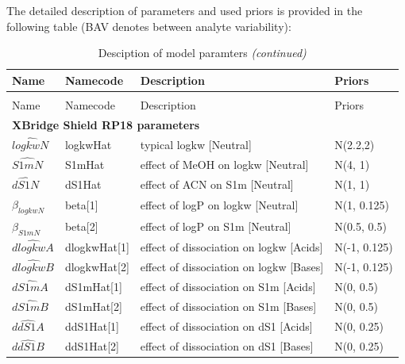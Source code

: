 \documentclass[
]{article}
\begin{document}
The detailed description of parameters and used priors is provided in
the following table (BAV denotes between analyte variability):

\begin{longtable}[t]{l|l|l|l}
\caption{Desciption of model paramters}\\
\hline
Name & Namecode & Description & Priors\\
\hline
\endfirsthead
\caption[]{Desciption of model paramters \textit{(continued)}}\\
\hline
Name & Namecode & Description & Priors\\
\hline
\endhead
\multicolumn{4}{l}{\textbf{XBridge Shield RP18 parameters}}\\
\hline
\hspace{1em}$\widehat{logkwN}$ & logkwHat & typical logkw [Neutral] & N(2.2,2)\\
\hline
\hspace{1em}$\widehat{S1mN}$ & S1mHat & effect of MeOH on logkw [Neutral] & N(4, 1)\\
\hline
\hspace{1em}$\widehat{dS1N}$ & dS1Hat & effect of ACN on S1m [Neutral] & N(1, 1)\\
\hline
\hspace{1em}$\beta_{logkwN}$ & beta[1] & effect of logP on logkw [Neutral] & N(1, 0.125)\\
\hline
\hspace{1em}$\beta_{S1mN}$ & beta[2] & effect of logP on S1m [Neutral] & N(0.5, 0.5)\\
\hline
\hspace{1em}$\widehat{dlogkwA}$ & dlogkwHat[1] & effect of dissociation on logkw [Acids] & N(-1, 0.125)\\
\hline
\hspace{1em}$\widehat{dlogkwB}$ & dlogkwHat[2] & effect of dissociation on logkw [Bases] & N(-1, 0.125)\\
\hline
\hspace{1em}$\widehat{dS1mA}$ & dS1mHat[1] & effect of dissociation on S1m [Acids] & N(0, 0.5)\\
\hline
\hspace{1em}$\widehat{dS1mB}$ & dS1mHat[2] & effect of dissociation on S1m [Bases] & N(0, 0.5)\\
\hline
\hspace{1em}$\widehat{ddS1A}$ & ddS1Hat[1] & effect of dissociation on dS1 [Acids] & N(0, 0.25)\\
\hline
\hspace{1em}$\widehat{ddS1B}$ & ddS1Hat[2] & effect of dissociation on dS1 [Bases] & N(0, 0.25)\\

\end{longtable}
\end{document}
